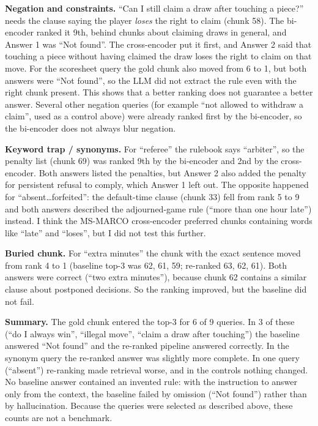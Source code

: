 \documentclass[11pt,a4paper]{article}
\begin{document}
\textbf{Negation and constraints.} ``Can I still claim a draw after touching a piece?'' needs the clause saying the player \emph{loses} the right to claim (chunk 58). The bi-encoder ranked it 9th, behind chunks about claiming draws in general, and Answer 1 was ``Not found''. The cross-encoder put it first, and Answer 2 said that touching a piece without having claimed the draw loses the right to claim on that move. For the scoresheet query the gold chunk also moved from 6 to 1, but both answers were ``Not found'', so the LLM did not extract the rule even with the right chunk present. This shows that a better ranking does not guarantee a better answer. Several other negation queries (for example ``not allowed to withdraw a claim'', used as a control above) were already ranked first by the bi-encoder, so the bi-encoder does not always blur negation.

\textbf{Keyword trap / synonyms.} For ``referee'' the rulebook says ``arbiter'', so the penalty list (chunk 69) was ranked 9th by the bi-encoder and 2nd by the cross-encoder. Both answers listed the penalties, but Answer 2 also added the penalty for persistent refusal to comply, which Answer 1 left out. The opposite happened for ``absent\ldots forfeited'': the default-time clause (chunk 33) fell from rank 5 to 9 and both answers described the adjourned-game rule (``more than one hour late'') instead. I think the MS-MARCO cross-encoder preferred chunks containing words like ``late'' and ``loses'', but I did not test this further.

\textbf{Buried chunk.} For ``extra minutes'' the chunk with the exact sentence moved from rank 4 to 1 (baseline top-3 was 62, 61, 59; re-ranked 63, 62, 61). Both answers were correct (``two extra minutes''), because chunk 62 contains a similar clause about postponed decisions. So the ranking improved, but the baseline did not fail.

\textbf{Summary.} The gold chunk entered the top-3 for 6 of 9 queries. In 3 of these (``do I always win'', ``illegal move'', ``claim a draw after touching'') the baseline answered ``Not found'' and the re-ranked pipeline answered correctly. In the synonym query the re-ranked answer was slightly more complete. In one query (``absent'') re-ranking made retrieval worse, and in the controls nothing changed. No baseline answer contained an invented rule: with the instruction to answer only from the context, the baseline failed by omission (``Not found'') rather than by hallucination. Because the queries were selected as described above, these counts are not a benchmark.
\end{document}

